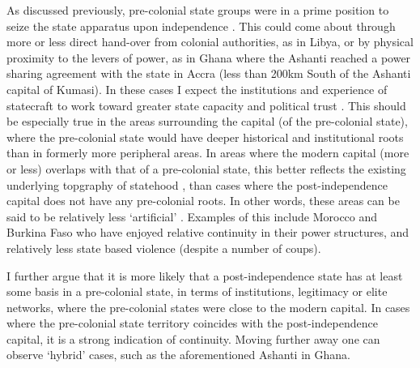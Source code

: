 \documentclass[12pt]{article}
\begin{document}
As discussed previously, pre-colonial state groups were in a prime position to
seize the state apparatus upon independence \citep{Paine2019,
Wucherpfennig2016}. This could come about through more or less direct hand-over
from colonial authorities, as in Libya, or by physical proximity to the levers
of power, as in Ghana where the Ashanti reached a power sharing agreement with
the state in Accra (less than 200km South of the Ashanti capital of Kumasi). In
these cases I expect the institutions and experience of statecraft to work
toward greater state capacity and political trust \citep{Depetris-Chauvin2016}.
This should be especially true in the areas surrounding the capital (of the
pre-colonial state), where the pre-colonial state would have deeper historical
and institutional roots than in formerly more peripheral areas. In areas where
the modern capital (more or less) overlaps with that of a pre-colonial state,
this better reflects the existing underlying topgraphy of statehood , than cases
where the post-independence capital does not have any pre-colonial roots. In other
words, these areas can be said to be relatively less `artificial'
\citep{Alesina2011}. Examples of this include Morocco and Burkina Faso who have
enjoyed relative continuity in their power structures, and relatively less state
based violence (despite a number of coups). 

I further argue that it is more likely that a post-independence state has at least
some basis in a pre-colonial state, in terms of institutions, legitimacy or
elite networks, where the pre-colonial states were close to the modern capital.
In cases where the pre-colonial state territory coincides with the
post-independence capital, it is a strong indication of continuity. Moving
further away one can observe `hybrid' cases, such as the aforementioned Ashanti
in Ghana.  
\end{document}
